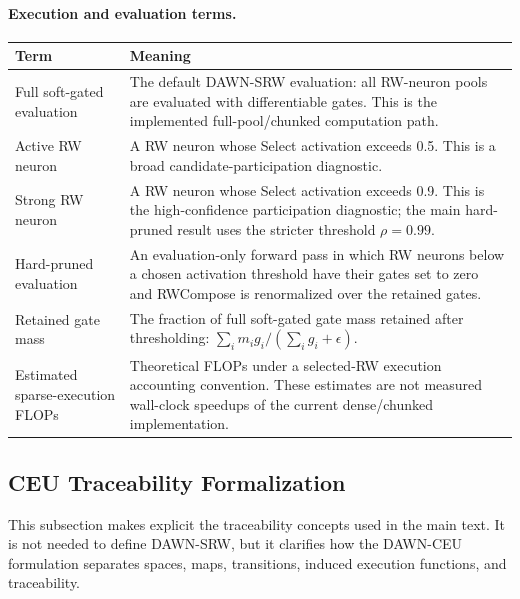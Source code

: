 \documentclass{article}
\begin{document}
\noindent\begin{minipage}{\textwidth}
\paragraph{Execution and evaluation terms.}
\begin{center}
\small
\setlength{\tabcolsep}{5pt}
\renewcommand{\arraystretch}{1.12}
\begin{tabularx}{\textwidth}{lX}
\toprule
\textbf{Term} & \textbf{Meaning} \\
\midrule
Full soft-gated evaluation & The default DAWN-SRW evaluation: all RW-neuron pools are evaluated with differentiable gates. This is the implemented full-pool/chunked computation path. \\
Active RW neuron & A RW neuron whose Select activation exceeds 0.5. This is a broad candidate-participation diagnostic. \\
Strong RW neuron & A RW neuron whose Select activation exceeds 0.9. This is the high-confidence participation diagnostic; the main hard-pruned result uses the stricter threshold $\rho=0.99$. \\
Hard-pruned evaluation & An evaluation-only forward pass in which RW neurons below a chosen activation threshold have their gates set to zero and RWCompose is renormalized over the retained gates. \\
Retained gate mass & The fraction of full soft-gated gate mass retained after thresholding: $\sum_i m_i g_i / (\sum_i g_i+\epsilon)$. \\
Estimated sparse-execution FLOPs & Theoretical FLOPs under a selected-RW execution accounting convention. These estimates are not measured wall-clock speedups of the current dense/chunked implementation. \\
\bottomrule
\end{tabularx}
\end{center}
\end{minipage}
\par\medskip

\subsection{CEU Traceability Formalization}
\label{app:ceu_traceability_formalization}

This subsection makes explicit the traceability concepts used in the main text. It is not needed to define DAWN-SRW, but it clarifies how the DAWN-CEU formulation separates spaces, maps, transitions, induced execution functions, and traceability.
\end{document}
